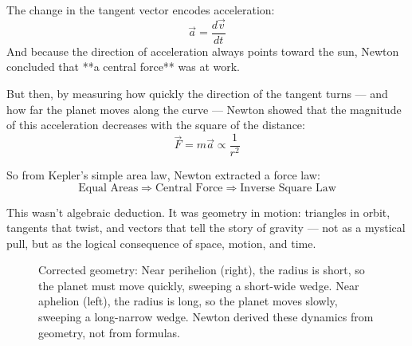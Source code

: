 The change in the tangent vector encodes acceleration:  
\[
\vec{a} = \frac{d\vec{v}}{dt}
\]
And because the direction of acceleration always points toward the sun, Newton concluded that **a central force** was at work.

But then, by measuring how quickly the direction of the tangent turns — and how far the planet moves along the curve — Newton showed that the magnitude of this acceleration decreases with the square of the distance:
\[
\vec{F} = m \vec{a} \propto \frac{1}{r^2}
\]

So from Kepler’s simple area law, Newton extracted a force law:
\[
\text{Equal Areas} \Rightarrow \text{Central Force} \Rightarrow \text{Inverse Square Law}
\]

This wasn’t algebraic deduction. It was geometry in motion: triangles in orbit, tangents that twist, and vectors that tell the story of gravity — not as a mystical pull, but as the logical consequence of space, motion, and time.

\begin{figure}[H]
\centering
{}
\caption{Corrected geometry: Near perihelion (right), the radius is short, so the planet must move quickly, sweeping a short-wide wedge. Near aphelion (left), the radius is long, so the planet moves slowly, sweeping a long-narrow wedge. Newton derived these dynamics from geometry, not from formulas.}
\end{figure}


